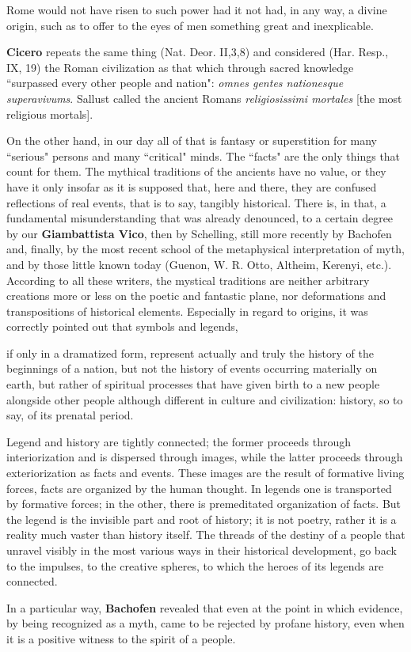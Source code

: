\begin{quotex}
Rome would not have risen to such power had it not had, in any way, a divine origin, such as to offer to the eyes of men something great and inexplicable. 

\end{quotex}
\textbf{Cicero} repeats the same thing (Nat. Deor. II,3,8) and considered (Har. Resp., IX, 19) the Roman civilization as that which through sacred knowledge ``surpassed every other people and nation": \emph{omnes gentes nationesque superavivums}. Sallust called the ancient Romans \emph{religiosissimi mortales} [the most religious mortals].

On the other hand, in our day all of that is fantasy or superstition for many ``serious" persons and many ``critical" minds. The ``facts" are the only things that count for them. The mythical traditions of the ancients have no value, or they have it only insofar as it is supposed that, here and there, they are confused reflections of real events, that is to say, tangibly historical. There is, in that, a fundamental misunderstanding that was already denounced, to a certain degree by our \textbf{Giambattista Vico}, then by Schelling, still more recently by Bachofen and, finally, by the most recent school of the metaphysical interpretation of myth, and by those little known today (Guenon, W. R. Otto, Altheim, Kerenyi, etc.). According to all these writers, the mystical traditions are neither arbitrary creations more or less on the poetic and fantastic plane, nor deformations and transpositions of historical elements. Especially in regard to origins, it was correctly pointed out that symbols and legends,

\begin{quotex}
if only in a dramatized form, represent actually and truly the history of the beginnings of a nation, but not the history of events occurring materially on earth, but rather of spiritual processes that have given birth to a new people alongside other people although different in culture and civilization: history, so to say, of its prenatal period.

Legend and history are tightly connected; the former proceeds through interiorization and is dispersed through images, while the latter proceeds through exteriorization as facts and events. These images are the result of formative living forces, facts are organized by the human thought. In legends one is transported by formative forces; in the other, there is premeditated organization of facts. But the legend is the invisible part and root of history; it is not poetry, rather it is a reality much vaster than history itself. The threads of the destiny of a people that unravel visibly in the most various ways in their historical development, go back to the impulses, to the creative spheres, to which the heroes of its legends are connected. 

\end{quotex}
In a particular way, \textbf{Bachofen} revealed that even at the point in which evidence, by being recognized as a myth, came to be rejected by profane history, even when it is a positive witness to the spirit of a people.

